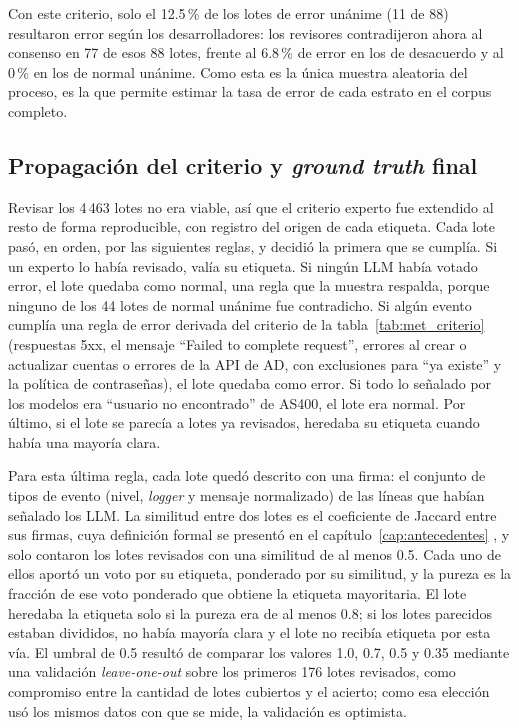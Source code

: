Con este criterio, solo el 12.5\,\% de los lotes de error unánime (11 de 88) resultaron error según los desarrolladores: los revisores contradijeron ahora al consenso en 77 de esos 88 lotes, frente al 6.8\,\% de error en los de desacuerdo y al 0\,\% en los de normal unánime. Como esta es la única muestra aleatoria del proceso, es la que permite estimar la tasa de error de cada estrato en el corpus completo.

\subsection{Propagación del criterio y \textit{ground truth} final}\label{subsec:met_propagacion}

Revisar los 4\,463 lotes no era viable, así que el criterio experto fue extendido al resto de forma reproducible, con registro del origen de cada etiqueta. Cada lote pasó, en orden, por las siguientes reglas, y decidió la primera que se cumplía. Si un experto lo había revisado, valía su etiqueta. Si ningún LLM había votado error, el lote quedaba como normal, una regla que la muestra respalda, porque ninguno de los 44 lotes de normal unánime fue contradicho. Si algún evento cumplía una regla de error derivada del criterio de la tabla~\ref{tab:met_criterio} (respuestas 5xx, el mensaje ``Failed to complete request'', errores al crear o actualizar cuentas o errores de la API de AD, con exclusiones para ``ya existe'' y la política de contraseñas), el lote quedaba como error. Si todo lo señalado por los modelos era ``usuario no encontrado'' de AS400, el lote era normal. Por último, si el lote se parecía a lotes ya revisados, heredaba su etiqueta cuando había una mayoría clara.

Para esta última regla, cada lote quedó descrito con una firma: el conjunto de tipos de evento (nivel, \textit{logger} y mensaje normalizado) de las líneas que habían señalado los LLM. La similitud entre dos lotes es el coeficiente de Jaccard entre sus firmas, cuya definición formal se presentó en el capítulo~\ref{cap:antecedentes} \cite{manning2008_ir}, y solo contaron los lotes revisados con una similitud de al menos 0.5. Cada uno de ellos aportó un voto por su etiqueta, ponderado por su similitud, y la pureza es la fracción de ese voto ponderado que obtiene la etiqueta mayoritaria. El lote heredaba la etiqueta solo si la pureza era de al menos 0.8; si los lotes parecidos estaban divididos, no había mayoría clara y el lote no recibía etiqueta por esta vía. El umbral de 0.5 resultó de comparar los valores 1.0, 0.7, 0.5 y 0.35 mediante una validación \textit{leave-one-out} sobre los primeros 176 lotes revisados, como compromiso entre la cantidad de lotes cubiertos y el acierto; como esa elección usó los mismos datos con que se mide, la validación es optimista.

